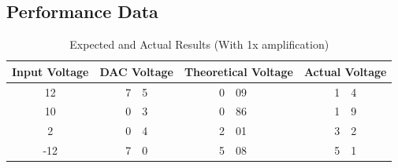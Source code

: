 \subsection{Performance Data}
\begin{table}[hbp]
\caption[Test Results]{Expected and Actual Results (With 1x amplification)}
\begin{center}
\begin{tabular}{c| r @{.} l r @{.} l r @{.} l}  
	Input Voltage & \multicolumn{2}{r}{DAC Voltage} &
	\multicolumn{2}{r}{Theoretical Voltage} &
	\multicolumn{2}{r}{Actual Voltage} \\ \hline
	12 & 7 & 5 & 0 & 09 & 1 & 4 \\ \hline
	10 & 0 & 3 & 0 & 86 & 1 & 9 \\ \hline
	2  & 0 & 4 & 2 & 01 & 3 & 2 \\ \hline
	-12 & 7 & 0 & 5 & 08 &5 & 1 \\
\end{tabular}
\end{center}
\label{tab:analog input data}
\end{table}



